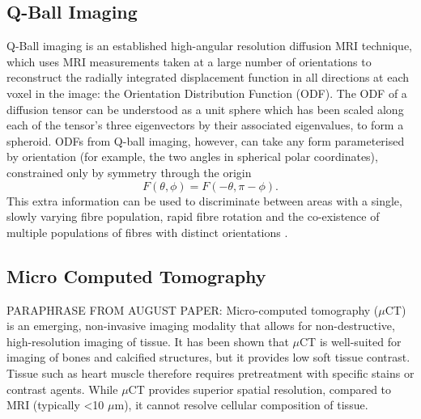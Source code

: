   \subsection{Q-Ball Imaging} %
  \label{sub:q_ball_imaging}
    Q-Ball imaging is an established high-angular resolution diffusion MRI technique, which uses MRI measurements taken at a large number of orientations to reconstruct the radially integrated displacement function in all directions at each voxel in the image: the Orientation Distribution Function (ODF). The ODF of a diffusion tensor can be understood as a unit sphere which has been scaled along each of the tensor's three eigenvectors by their associated eigenvalues, to form a spheroid. ODFs from Q-ball imaging, however, can take any form parameterised by orientation (for example, the two angles in spherical polar coordinates), constrained only by symmetry through the origin
    \begin{equation}
      F(\theta, \phi) = F(-\theta, \pi - \phi).
    \end{equation}
    This extra information can be used to discriminate between areas with a single, slowly varying fibre population, rapid fibre rotation and the co-existence of multiple populations of fibres with distinct orientations \cite{Dierckx2009}.
  
  
  \subsection{Micro Computed Tomography} %
  \label{sub:micro_computed_tomography}
    PARAPHRASE FROM AUGUST PAPER: Micro-computed tomography ($\mu$CT) is an emerging, non-invasive imaging modality that allows for non-destructive, high-resolution imaging of tissue. It has been shown that $\mu$CT is well-suited for imaging of bones and calcified structures, but it provides low soft tissue contrast. Tissue such as heart muscle therefore requires pretreatment with specific stains or contrast agents. While $\mu$CT provides superior spatial resolution, compared to MRI (typically <10 $\mu$m), it cannot resolve cellular composition of tissue.
  
